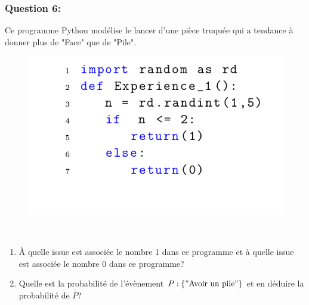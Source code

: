 \documentclass[t,12pt]{beamer}
\begin{document}
\begin{frame}
	\frametitle{Question 6: }
	Ce programme Python modélise le lancer d'une pièce truquée qui a tendance à donner plus de "Face" que de "Pile". 
	\begin{figure}
		\includegraphics[scale=0.4]{3.png}
	\end{figure}\hfill\\[-1.5cm]
\begin{enumerate}
	\item À quelle issue est associée le nombre 1 dans ce programme et à quelle issue est associée le nombre 0 dans ce programme? 
	\item Quelle est la probabilité de l'évènement $P: \{"\text{Avoir un pile}"\}$ et en déduire la probabilité de $\overline{P}$?
\end{enumerate}
\end{frame}
\end{document}
